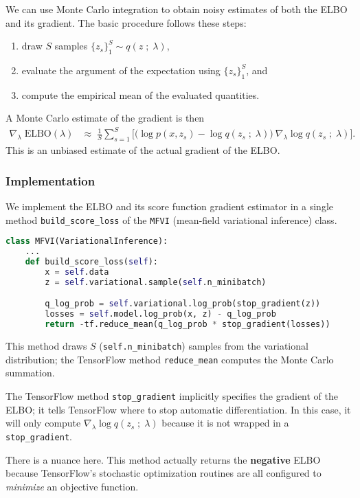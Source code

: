We can use Monte Carlo integration to obtain noisy estimates of both the ELBO
and its gradient. The basic procedure follows these steps:
\begin{enumerate}
  \item draw $S$ samples $\{z_s\}_1^S \sim q(z\;;\;\lambda)$,
  \item evaluate the argument of the expectation using $\{z_s\}_1^S$, and
  \item compute the empirical mean of the evaluated quantities.
\end{enumerate}

A Monte Carlo estimate of the gradient is then
\begin{align*}
  \nabla_\lambda\;
  \text{ELBO}(\lambda)
  &\approx\; 
  \frac{1}{S}
  \sum_{s=1}^{S}
  \big[
  \big(
  \log p(x, z_s)
  -
  \log q(z_s\;;\;\lambda)
  \big)
  \:
  \nabla_\lambda \log q(z_s\;;\;\lambda)
  \big].
\end{align*}
This is an unbiased estimate of the actual gradient of the ELBO. 

\subsubsection{Implementation}

We implement the ELBO and its score function gradient estimator in a single
method \texttt{build_score_loss} of the \texttt{MFVI} (mean-field variational
inference) class.
\begin{lstlisting}[language=Python]
class MFVI(VariationalInference):
    ...
    def build_score_loss(self):
        x = self.data
        z = self.variational.sample(self.n_minibatch)

        q_log_prob = self.variational.log_prob(stop_gradient(z))
        losses = self.model.log_prob(x, z) - q_log_prob
        return -tf.reduce_mean(q_log_prob * stop_gradient(losses))
\end{lstlisting}

This method draws $S$ (\texttt{self.n_minibatch}) samples from the variational
distribution; the TensorFlow method \texttt{reduce_mean} computes the Monte
Carlo summation. 

The TensorFlow method \texttt{stop_gradient} implicitly specifies the gradient
of the ELBO; it tells TensorFlow where to stop automatic differentiation. In
this case, it will only compute $\nabla_\lambda \log q(z_s\;;\;\lambda)$ because
it is not wrapped in a \texttt{stop_gradient}.

There is a nuance here. This method actually returns the \textbf{negative} ELBO
because TensorFlow's stochastic optimization routines are all configured to
\emph {minimize} an objective function.

